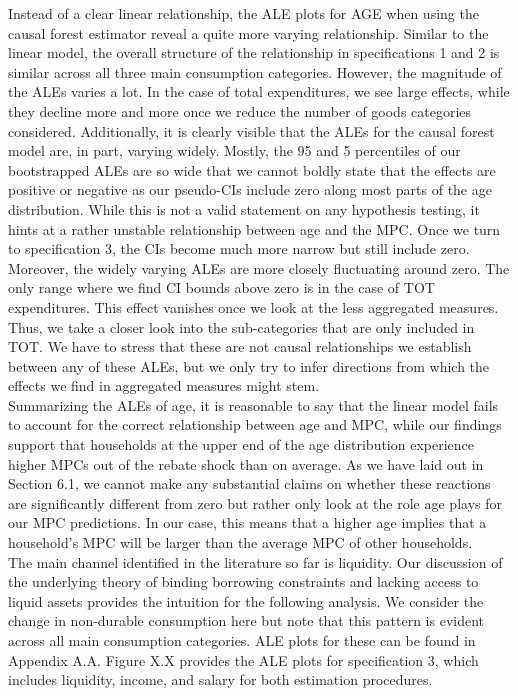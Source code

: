 Instead of a clear linear relationship, the ALE plots for AGE when using the causal forest estimator reveal a quite more varying relationship. Similar to the linear model, the overall structure of the relationship in specifications 1 and 2 is similar across all three main consumption categories. However, the magnitude of the ALEs varies a lot. In the case of total expenditures, we see large effects, while they decline more and more once we reduce the number of goods categories considered. Additionally, it is clearly visible that the ALEs for the causal forest model are, in part, varying widely. Mostly, the 95 and 5 percentiles of our bootstrapped ALEs are so wide that we cannot boldly state that the effects are positive or negative as our pseudo-CIs include zero along most parts of the age distribution. While this is not a valid statement on any hypothesis testing, it hints at a rather unstable relationship between age and the MPC. Once we turn to specification 3, the CIs become much more narrow but still include zero. Moreover, the widely varying ALEs are more closely fluctuating around zero. The only range where we find CI bounds above zero is in the case of TOT expenditures. This effect vanishes once we look at the less aggregated measures. Thus, we take a closer look into the sub-categories that are only included in TOT. We have to stress that these are not causal relationships we establish between any of these ALEs, but we only try to infer directions from which the effects we find in aggregated measures might stem. \\
Summarizing the ALEs of age, it is reasonable to say that the linear model fails to account for the correct relationship between age and MPC, while our findings support that households at the upper end of the age distribution experience higher MPCs out of the rebate shock than on average. As we have laid out in Section 6.1, we cannot make any substantial claims on whether these reactions are significantly different from zero but rather only look at the role age plays for our MPC predictions. In our case, this means that a higher age implies that a household's MPC will be larger than the average MPC of other households. \\
The main channel identified in the literature so far is liquidity. Our discussion of the underlying theory of binding borrowing constraints and lacking access to liquid assets provides the intuition for the following analysis. We consider the change in non-durable consumption here but note that this pattern is evident across all main consumption categories. ALE plots for these can be found in Appendix A.A. Figure X.X provides the ALE plots for specification 3, which includes liquidity, income, and salary for both estimation procedures. \\
